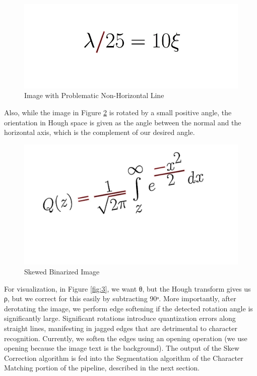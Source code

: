 \documentclass[journal]{IEEEtran}
\begin{document}
 \begin{figure}[!t]
    \centering
    \includegraphics[width=\columnwidth]{fig1}
    \caption{Image with Problematic Non-Horizontal Line}
    \label{fig:1}
 \end{figure}
 
 Also, while the image in Figure \ref{fig:2} is rotated by a small positive angle, the orientation in Hough space is given as the angle between the normal and the horizontal axis, which is the complement of our desired angle. 
 
\begin{figure}[!t]
  \centering
  \includegraphics[width=\columnwidth]{fig2}
  \caption{Skewed Binarized Image}
  \label{fig:2}
\end{figure}
 
 For visualization, in Figure \ref{fig:3}, we want θ, but the Hough transform gives us ρ, but we correct for this easily by subtracting 90ᵒ. More importantly, after derotating the image, we perform edge softening if the detected rotation angle is significantly large. Significant rotations introduce quantization errors along straight lines, manifesting in jagged edges that are detrimental to character recognition. Currently, we soften the edges using an opening operation (we use opening because the image text is the background). The output of the Skew Correction algorithm is fed into the Segmentation algorithm of the Character Matching portion of the pipeline, described in the next section.
 
\end{document}
